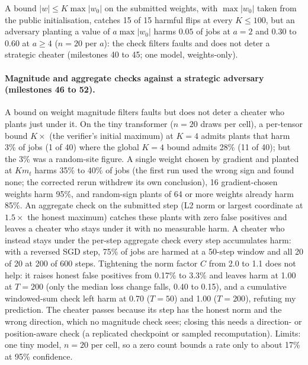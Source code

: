 \documentclass[sigconf,anonymous]{acmart}
\begin{document}
A bound $|w|\le K\max|w_0|$ on the submitted weights, with $\max|w_0|$ taken from the public initialisation, catches 15 of 15 harmful flips at every $K\le100$, but an adversary planting a value of $a\max|w_0|$ harms $0.05$ of jobs at $a=2$ and $0.30$ to $0.60$ at $a\ge4$ ($n=20$ per $a$): the check filters faults and does not deter a strategic cheater (milestones 40 to 45; one model, weights-only).
\paragraph{Magnitude and aggregate checks against a strategic adversary (milestones 46 to 52).} A bound on weight magnitude filters faults but does not deter a cheater who plants just under it. On the tiny transformer ($n=20$ draws per cell), a per-tensor bound $K\times$ (the verifier's initial maximum) at $K=4$ admits plants that harm 3\% of jobs (1 of 40) where the global $K=4$ bound admits 28\% (11 of 40); but the 3\% was a random-site figure. A single weight chosen by gradient and planted at $K m_t$ harms 35\% to 40\% of jobs (the first run used the wrong sign and found none; the corrected rerun withdrew its own conclusion), 16 gradient-chosen weights harm 95\%, and random-sign plants of 64 or more weights already harm 85\%. An aggregate check on the submitted step (L2 norm or largest coordinate at $1.5\times$ the honest maximum) catches these plants with zero false positives and leaves a cheater who stays under it with no measurable harm. A cheater who instead stays under the per-step aggregate check every step accumulates harm: with a reversed SGD step, 75\% of jobs are harmed at a 50-step window and all 20 of 20 at 200 of 600 steps. Tightening the norm factor $C$ from 2.0 to 1.1 does not help: it raises honest false positives from 0.17\% to 3.3\% and leaves harm at 1.00 at $T=200$ (only the median loss change falls, 0.40 to 0.15), and a cumulative windowed-sum check left harm at 0.70 ($T=50$) and 1.00 ($T=200$), refuting my prediction. The cheater passes because its step has the honest norm and the wrong direction, which no magnitude check sees; closing this needs a direction- or position-aware check (a replicated checkpoint or sampled recomputation). Limits: one tiny model, $n=20$ per cell, so a zero count bounds a rate only to about 17\% at 95\% confidence.
\end{document}
